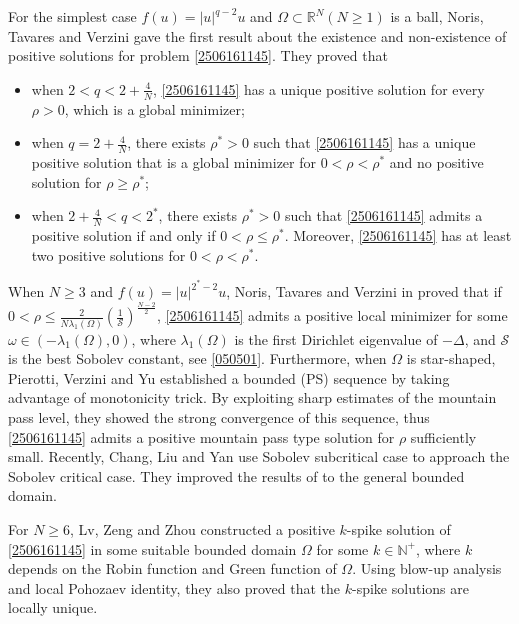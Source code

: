 \documentclass[10pt]{article}
\numberwithin{equation}{section}
\numberwithin{equation}{section}
\begin{document}
\medskip
{}
\medskip

For the simplest case $f(u)=|u|^{q-2}u$ and $\Omega\subset\mathbb{R}^N(N\geq1)$ is a ball, Noris, Tavares and Verzini \cite{Noris14} gave the first result about the existence and non-existence of positive  solutions for problem \eqref{2506161145}. They proved that
\begin{itemize}
\item[\rm (i)] when $2<q<2+\frac{4}{N}$,  \eqref{2506161145} has a unique positive solution for every $\rho>0$, which is a global minimizer;
\item[\rm (ii)]  when $q=2+\frac{4}{N}$, there exists $\rho^{*}>0$ such that \eqref{2506161145} has a unique positive solution that is a global minimizer for $0<\rho<\rho^{*}$ and no positive solution for $\rho\ge \rho^{*}$;
\item[\rm (iii)]  when $2+\frac{4}{N}<q<2^{*}$, there exists $\rho^{*}>0$ such that \eqref{2506161145} admits a positive solution if and only if $0<\rho\le \rho^*$. Moreover, \eqref{2506161145} has at least two positive solutions for $0<\rho<\rho^*$.
\end{itemize}
\medskip
{}
\medskip

When  $N\ge 3$ and $f(u)=|u|^{2^*-2}u$, Noris, Tavares and Verzini in \cite[Theorem 1.11]{Noris19} proved that if $ 0<\rho\le \frac{2}{N\lambda_1(\Omega)}(\frac{1}{\mathcal{S}})^{\frac{N-2}{2}}$, \eqref{2506161145} admits a positive local minimizer for some $\omega\in (-\lambda_1(\Omega), 0)$, where $\lambda_1(\Omega)$ is the first Dirichlet eigenvalue of $-\Delta$, and $\mathcal{S}$ is the best Sobolev constant, see \eqref{050501}. Furthermore, when $\Omega$ is star-shaped, Pierotti, Verzini and Yu \cite{Pierotti25} established a bounded (PS) sequence by taking advantage of monotonicity trick. By exploiting sharp estimates of the mountain pass level, they showed the strong convergence of this sequence, thus \eqref{2506161145} admits a positive mountain pass type solution for $\rho$ sufficiently small. Recently, Chang, Liu and Yan \cite{CLY2025} use Sobolev subcritical case to approach the Sobolev critical  case. They improved the results of \cite{Pierotti25} to the general bounded domain.

\smallskip
For $N\ge 6$, Lv, Zeng and Zhou \cite{LvZZ25} constructed a positive $k$-spike solution of \eqref{2506161145} in some suitable bounded domain $\Omega$ for some $k\in\mathbb{N}^+$, where $k$ depends on the Robin function and Green function of $\Omega$. Using blow-up analysis and local Pohozaev identity, they also proved that the $k$-spike solutions are locally unique.
\end{document}
